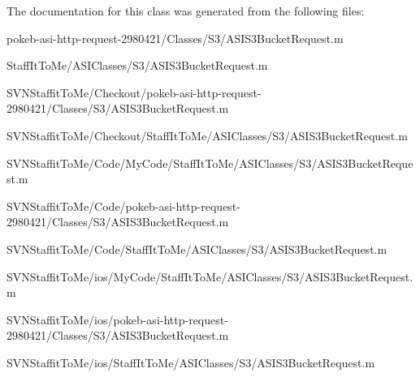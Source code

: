 \-The documentation for this class was generated from the following files\-:\begin{DoxyCompactItemize}
\item 
pokeb-\/asi-\/http-\/request-\/2980421/\-Classes/\-S3/\-A\-S\-I\-S3\-Bucket\-Request.\-m\item 
\-Staff\-It\-To\-Me/\-A\-S\-I\-Classes/\-S3/\-A\-S\-I\-S3\-Bucket\-Request.\-m\item 
\-S\-V\-N\-Staffit\-To\-Me/\-Checkout/pokeb-\/asi-\/http-\/request-\/2980421/\-Classes/\-S3/\-A\-S\-I\-S3\-Bucket\-Request.\-m\item 
\-S\-V\-N\-Staffit\-To\-Me/\-Checkout/\-Staff\-It\-To\-Me/\-A\-S\-I\-Classes/\-S3/\-A\-S\-I\-S3\-Bucket\-Request.\-m\item 
\-S\-V\-N\-Staffit\-To\-Me/\-Code/\-My\-Code/\-Staff\-It\-To\-Me/\-A\-S\-I\-Classes/\-S3/\-A\-S\-I\-S3\-Bucket\-Request.\-m\item 
\-S\-V\-N\-Staffit\-To\-Me/\-Code/pokeb-\/asi-\/http-\/request-\/2980421/\-Classes/\-S3/\-A\-S\-I\-S3\-Bucket\-Request.\-m\item 
\-S\-V\-N\-Staffit\-To\-Me/\-Code/\-Staff\-It\-To\-Me/\-A\-S\-I\-Classes/\-S3/\-A\-S\-I\-S3\-Bucket\-Request.\-m\item 
\-S\-V\-N\-Staffit\-To\-Me/ios/\-My\-Code/\-Staff\-It\-To\-Me/\-A\-S\-I\-Classes/\-S3/\-A\-S\-I\-S3\-Bucket\-Request.\-m\item 
\-S\-V\-N\-Staffit\-To\-Me/ios/pokeb-\/asi-\/http-\/request-\/2980421/\-Classes/\-S3/\-A\-S\-I\-S3\-Bucket\-Request.\-m\item 
\-S\-V\-N\-Staffit\-To\-Me/ios/\-Staff\-It\-To\-Me/\-A\-S\-I\-Classes/\-S3/\-A\-S\-I\-S3\-Bucket\-Request.\-m\end{DoxyCompactItemize}
